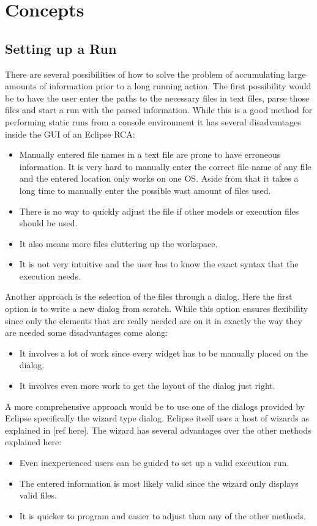 \chapter{Concepts}
\label{chapter:AutoConcepts}

\section{Setting up a Run}
\label{section:AutoConceptsSetup}
There are several possibilities of how to solve the problem of accumulating
large amounts of information prior to a long running action.
The first possibility would be to have the user enter the paths to the 
necessary files in text files, parse those files and start a run with
the parsed information. While this is a good method for performing
static runs from a console environment it has several disadvantages
inside the GUI of an Eclipse RCA:
\begin{itemize}
 \item Manually entered file names in a text file are prone to have erroneous information.
It is very hard to manually enter the correct file name of any file and the entered location
only works on one OS. Aside from that it takes a long time to manually enter the possible wast
amount of files used.
 \item There is no way to quickly adjust the file if other models or execution files should be used.
 \item It also means more files cluttering up the workspace.
 \item It is not very intuitive and the user has to know the exact syntax that the execution needs.
\end{itemize}

Another approach is the selection of the files through a dialog.
Here the first option is to write a new dialog from scratch. While this option
ensures flexibility since only the elements that are really needed are on it in
exactly the way they are needed some disadvantages come along:
\begin{itemize}
 \item It involves a lot of work since every widget has to be manually placed on the dialog.
 \item It involves even more work to get the layout of the dialog just right.
\end{itemize}

A more comprehensive approach would be to use one of the dialogs provided by Eclipse specifically the wizard type dialog.
Eclipse itself uses a host of wizards as explained in [ref here].
The wizard has several advantages over the other methods explained here:
\begin{itemize}
 \item Even inexperienced users can be guided to set up a valid execution run.
 \item The entered information is most likely valid since the wizard only displays valid files.
 \item It is quicker to program and easier to adjust than any of the other methods.
\end{itemize}


